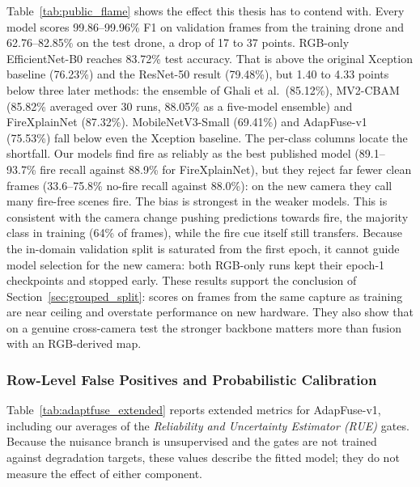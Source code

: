 \documentclass[journal]{IEEEtran}
\begin{document}
Table~\ref{tab:public_flame} shows the effect this thesis has to contend with. Every model scores 99.86--99.96\% F1 on validation frames from the training drone and 62.76--82.85\% on the test drone, a drop of 17 to 37 points. RGB-only EfficientNet-B0 reaches 83.72\% test accuracy. That is above the original Xception baseline (76.23\%) and the ResNet-50 result (79.48\%), but 1.40 to 4.33 points below three later methods: the ensemble of Ghali et al.\ (85.12\%), MV2-CBAM (85.82\% averaged over 30 runs, 88.05\% as a five-model ensemble) and FireXplainNet (87.32\%). MobileNetV3-Small (69.41\%) and AdapFuse-v1 (75.53\%) fall below even the Xception baseline. The per-class columns locate the shortfall. Our models find fire as reliably as the best published model (89.1--93.7\% fire recall against 88.9\% for FireXplainNet), but they reject far fewer clean frames (33.6--75.8\% no-fire recall against 88.0\%): on the new camera they call many fire-free scenes fire. The bias is strongest in the weaker models. This is consistent with the camera change pushing predictions towards fire, the majority class in training (64\% of frames), while the fire cue itself still transfers. Because the in-domain validation split is saturated from the first epoch, it cannot guide model selection for the new camera: both RGB-only runs kept their epoch-1 checkpoints and stopped early. These results support the conclusion of Section~\ref{sec:grouped_split}: scores on frames from the same capture as training are near ceiling and overstate performance on new hardware. They also show that on a genuine cross-camera test the stronger backbone matters more than fusion with an RGB-derived map.

\subsubsection{Row-Level False Positives and Probabilistic Calibration}
\label{sec:adaptfuse_extended}

Table~\ref{tab:adaptfuse_extended} reports extended metrics for AdapFuse-v1, including our averages of the \textit{Reliability and Uncertainty Estimator (RUE)} gates. Because the nuisance branch is unsupervised and the gates are not trained against degradation targets, these values describe the fitted model; they do not measure the effect of either component.
\end{document}
